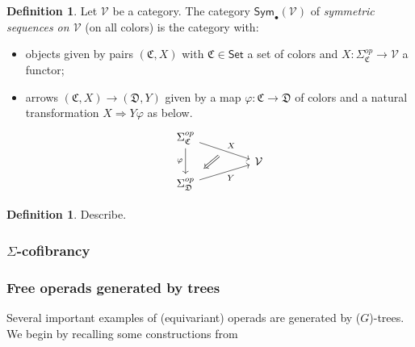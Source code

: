 \documentclass[a4paper,10pt
,draft
]{article}%
\numberwithin{equation}{section}
\numberwithin{figure}{section}
\theoremstyle{definition} %
\newtheorem{definition}[equation]{Definition}%
\newcommand{\1}{\ensuremath{\mathbbm 1}}%
\begin{document}
\begin{definition}
      Let $\mathcal{V}$ be a category.
      The category $\mathsf{Sym}_\bullet(\mathcal{V})$ of
      \textit{symmetric sequences on $\mathcal{V}$} 
      (on all colors) is the category with:
      \begin{itemize}
      \item objects given by pairs $(\mathfrak C, X)$ with
            $\mathfrak{C} \in \mathsf{Set}$ a set of colors and
            $X \colon \Sigma_{\mathfrak{C}}^{op} \to \mathcal{V}$ a functor;
      \item arrows $(\mathfrak C, X) \to (\mathfrak D, Y)$ given by a map 
            $\varphi \colon \mathfrak{C} \to \mathfrak{D}$ of colors and a natural transformation $X \Rightarrow Y \varphi$ as below.
            \begin{equation}
                  \label{SYMSEQMAP_EQ}
                  \begin{tikzcd}[row sep = tiny, column sep = 45pt]
                        \Sigma_{\mathfrak{C}}^{op} \arrow[dr, "X"{name=U}] 
                        \arrow{dd}[swap]{\varphi}
                        \\
                        & \mathcal{V}
                        \\
                        |[alias=V]| \Sigma_{\mathfrak{D}}^{op} \arrow[ur, "Y"']
                        \arrow[Leftarrow, from=V, to=U,shorten >=0.25cm,shorten <=0.25cm]
                  \end{tikzcd}
            \end{equation}
      \end{itemize}
\end{definition}

\begin{definition}
      Describe.
\end{definition}

\subsubsection{$\Sigma$-cofibrancy}


\subsubsection{Free operads generated by trees}

Several important examples of (equivariant) operads are generated by ($G$)-trees.
We begin by recalling some constructions from \cite[\S 2.3.1]{BP_HGOP} %
\end{document}
